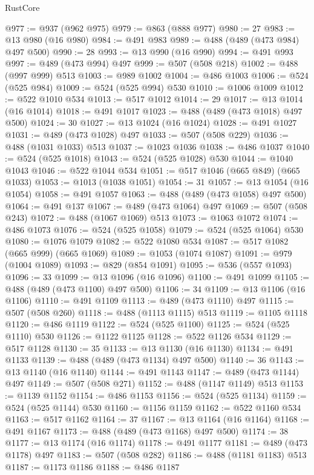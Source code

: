 \begin{lexlean}{RustCore}
\begin{coremodule}
@977 := @937 (@962 @975)
@979 := @863 (@888 @977)
@980 := 27
@983 := @13 @980 (@16 @980)
@984 := @491 @983
@989 := @488 (@489 (@473 @984) @497 @500)
@990 := 28
@993 := @13 @990 (@16 @990)
@994 := @491 @993
@997 := @489 (@473 @994) @497
@999 := @507 (@508 @218)
@1002 := @488 (@997 @999) @513
@1003 := @989 @1002
@1004 := @486 @1003
@1006 := @524 (@525 @984)
@1009 := @524 (@525 @994) @530
@1010 := @1006 @1009
@1012 := @522 @1010 @534
@1013 := @517 @1012
@1014 := 29
@1017 := @13 @1014 (@16 @1014)
@1018 := @491 @1017
@1023 := @488 (@489 (@473 @1018) @497 @500)
@1024 := 30
@1027 := @13 @1024 (@16 @1024)
@1028 := @491 @1027
@1031 := @489 (@473 @1028) @497
@1033 := @507 (@508 @229)
@1036 := @488 (@1031 @1033) @513
@1037 := @1023 @1036
@1038 := @486 @1037
@1040 := @524 (@525 @1018)
@1043 := @524 (@525 @1028) @530
@1044 := @1040 @1043
@1046 := @522 @1044 @534
@1051 := @517 @1046 (@665 @849) (@665 @1033)
@1053 := @1013 (@1038 @1051)
@1054 := 31
@1057 := @13 @1054 (@16 @1054)
@1058 := @491 @1057
@1063 := @488 (@489 (@473 @1058) @497 @500)
@1064 := @491 @137
@1067 := @489 (@473 @1064) @497
@1069 := @507 (@508 @243)
@1072 := @488 (@1067 @1069) @513
@1073 := @1063 @1072
@1074 := @486 @1073
@1076 := @524 (@525 @1058)
@1079 := @524 (@525 @1064) @530
@1080 := @1076 @1079
@1082 := @522 @1080 @534
@1087 := @517 @1082 (@665 @999) (@665 @1069)
@1089 := @1053 (@1074 @1087)
@1091 := @979 (@1004 @1089)
@1093 := @829 (@854 @1091)
@1095 := @536 (@557 @1093)
@1096 := 33
@1099 := @13 @1096 (@16 @1096)
@1100 := @491 @1099
@1105 := @488 (@489 (@473 @1100) @497 @500)
@1106 := 34
@1109 := @13 @1106 (@16 @1106)
@1110 := @491 @1109
@1113 := @489 (@473 @1110) @497
@1115 := @507 (@508 @260)
@1118 := @488 (@1113 @1115) @513
@1119 := @1105 @1118
@1120 := @486 @1119
@1122 := @524 (@525 @1100)
@1125 := @524 (@525 @1110) @530
@1126 := @1122 @1125
@1128 := @522 @1126 @534
@1129 := @517 @1128
@1130 := 35
@1133 := @13 @1130 (@16 @1130)
@1134 := @491 @1133
@1139 := @488 (@489 (@473 @1134) @497 @500)
@1140 := 36
@1143 := @13 @1140 (@16 @1140)
@1144 := @491 @1143
@1147 := @489 (@473 @1144) @497
@1149 := @507 (@508 @271)
@1152 := @488 (@1147 @1149) @513
@1153 := @1139 @1152
@1154 := @486 @1153
@1156 := @524 (@525 @1134)
@1159 := @524 (@525 @1144) @530
@1160 := @1156 @1159
@1162 := @522 @1160 @534
@1163 := @517 @1162
@1164 := 37
@1167 := @13 @1164 (@16 @1164)
@1168 := @491 @1167
@1173 := @488 (@489 (@473 @1168) @497 @500)
@1174 := 38
@1177 := @13 @1174 (@16 @1174)
@1178 := @491 @1177
@1181 := @489 (@473 @1178) @497
@1183 := @507 (@508 @282)
@1186 := @488 (@1181 @1183) @513
@1187 := @1173 @1186
@1188 := @486 @1187

\end{coremodule}
\end{lexlean}

